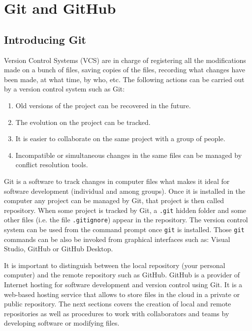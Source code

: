 
\chapter{Git and GitHub}


\section{Introducing Git}
    
Version Control Systems (VCS) are in charge of registering all the modifications made on a bunch of files, saving copies of the files, 
recording what changes have been made, at what time, by who, etc. 
The following actions can be carried out by a version control system such as Git: 

\begin{enumerate}
\setlength\itemsep{0.0cm}
    \item Old versions of the project can be recovered in the future.
    \item The evolution on the project can be tracked.
    \item It is easier to collaborate on the same project with a group of people.
    \item Incompatible or simultaneous changes in the same files can be managed by conflict resolution tools.
\end{enumerate}

Git is a software to track changes in computer files what makes it ideal for software development (individual and among groups). 
Once it is installed in the computer any project can be managed by Git, that project is then called repository.
When some project is tracked by Git, a \texttt{.git} hidden folder and some other files (i.e. the file \texttt{.gitignore}) appear in the 
repository.
The version control system can be used from the command prompt once \texttt{git} is installed. 
Those \texttt{git} commands can be also be invoked from graphical interfaces such as: Visual Studio, 
GitHub or GitHub Desktop. 

It is important to distinguish between the local repository (your personal computer) and the remote
repository such as GitHub.  
GitHub is a provider of Internet hosting for software development and version control using Git.
It is a web-based hosting service that allows to store files in the cloud in a private or public repository. 
The next sections covers the creation of local and remote repositories as well as 
procedures to work with collaborators and teams by developing software or modifying files. 


